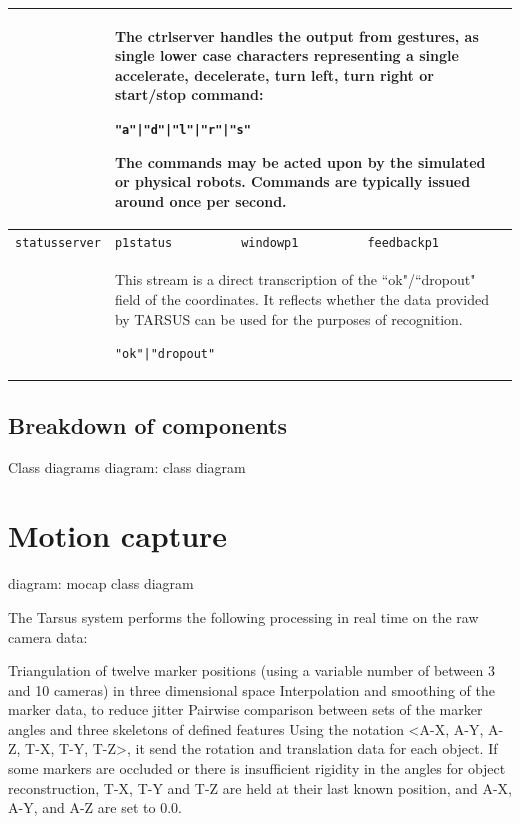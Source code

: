 \documentclass[12pt,a4,notitlepage]{report}
\renewcommand{\_}{\texttt{\symbol{95}}}
\newcommand{\<}{\texttt{\symbol{60}}}
\renewcommand{\>}{\texttt{\symbol{62}}}
\newcommand{\scopendpoint}[1]{\texttt{#1}}
\newcommand{\variable}[1]{\texttt{#1}}
\begin{document}
\begin{tabular}{l|p{2.5cm}p{4.5cm}p{4.5cm}}
 & \multicolumn{3}{l}{\begin{minipage}{12.5cm}%
The ctrlserver handles the output from gestures, as single lower case characters representing a single accelerate, decelerate, turn left, turn right or start/stop command:

\texttt{\<"a"|"d"|"l"|"r"|"s"\>}

The commands may be acted upon by the simulated or physical robots. Commands are typically issued around once per second.\rule[-2mm]{0mm}{3mm}
\end{minipage}}\\

\hline
\rule{0mm}{4.5mm}\variable{statusserver} & \scopendpoint{p1status} &
\scopendpoint{windowp1} & \scopendpoint{feedbackp1}\rule[-2mm]{0mm}{3mm}\\

 & \multicolumn{3}{l}{\begin{minipage}{12.5cm}%
This stream is a direct transcription of the ``ok"/``dropout" field of the coordinates. It reflects whether the data provided by TARSUS can be used for the purposes of recognition.

\texttt{\<"ok"|"dropout"\>}
\end{minipage}}\\
\end{tabular}

\subsection{Breakdown of components}

Class diagrams
{diagram: class diagram}

\section{Motion capture}

{diagram: mocap class diagram}

The Tarsus system performs the following processing in real time on the raw camera data:

Triangulation of twelve marker positions (using a variable number of between 3 and 10 cameras) in three dimensional space
Interpolation and smoothing of the marker data, to reduce jitter
Pairwise comparison between sets of the marker angles and three skeletons of defined features
Using the notation <A-X, A-Y, A-Z, T-X, T-Y, T-Z>, it send the rotation and translation data for each object. If some markers are occluded or there is insufficient rigidity in the angles for object reconstruction, T-X, T-Y and T-Z are held at their last known position, and A-X, A-Y, and A-Z are set to 0.0.
\end{document}
